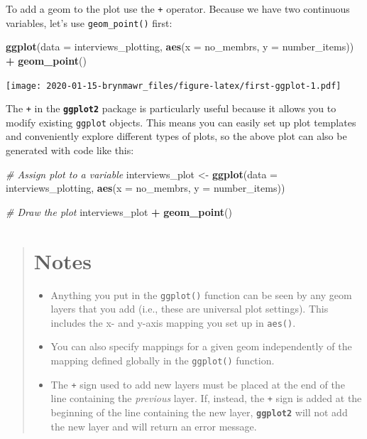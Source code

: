 \documentclass[]{book}
\newenvironment{Shaded}{\begin{snugshade}}{\end{snugshade}}
\newcommand{\KeywordTok}[1]{\textcolor[rgb]{0.13,0.29,0.53}{\textbf{#1}}}
\newcommand{\DataTypeTok}[1]{\textcolor[rgb]{0.13,0.29,0.53}{#1}}
\newcommand{\StringTok}[1]{\textcolor[rgb]{0.31,0.60,0.02}{#1}}
\newcommand{\CommentTok}[1]{\textcolor[rgb]{0.56,0.35,0.01}{\textit{#1}}}
\newcommand{\OperatorTok}[1]{\textcolor[rgb]{0.81,0.36,0.00}{\textbf{#1}}}
\newcommand{\NormalTok}[1]{#1}
\providecommand{\tightlist}{%
  \setlength{\itemsep}{0pt}\setlength{\parskip}{0pt}}
\begin{document}
To add a geom to the plot use the \texttt{+} operator. Because we have
two continuous variables, let's use \texttt{geom\_point()} first:

\begin{Shaded}
\begin{Highlighting}[]
\KeywordTok{ggplot}\NormalTok{(}\DataTypeTok{data =}\NormalTok{ interviews_plotting, }\KeywordTok{aes}\NormalTok{(}\DataTypeTok{x =}\NormalTok{ no_membrs, }\DataTypeTok{y =}\NormalTok{ number_items)) }\OperatorTok{+}
\StringTok{    }\KeywordTok{geom_point}\NormalTok{()}
\end{Highlighting}
\end{Shaded}

\texttt{[image: 2020-01-15-brynmawr\_files/figure-latex/first-ggplot-1.pdf]}

The \texttt{+} in the \textbf{\texttt{ggplot2}} package is particularly
useful because it allows you to modify existing \texttt{ggplot} objects.
This means you can easily set up plot templates and conveniently explore
different types of plots, so the above plot can also be generated with
code like this:

\begin{Shaded}
\begin{Highlighting}[]
\CommentTok{# Assign plot to a variable}
\NormalTok{interviews_plot <-}\StringTok{ }\KeywordTok{ggplot}\NormalTok{(}\DataTypeTok{data =}\NormalTok{ interviews_plotting, }\KeywordTok{aes}\NormalTok{(}\DataTypeTok{x =}\NormalTok{ no_membrs, }\DataTypeTok{y =}\NormalTok{ number_items))}

\CommentTok{# Draw the plot}
\NormalTok{interviews_plot }\OperatorTok{+}
\StringTok{    }\KeywordTok{geom_point}\NormalTok{()}
\end{Highlighting}
\end{Shaded}

\begin{quote}
\section{Notes}\label{notes}

\begin{itemize}
\tightlist
\item
  Anything you put in the \texttt{ggplot()} function can be seen by any
  geom layers that you add (i.e., these are universal plot settings).
  This includes the x- and y-axis mapping you set up in \texttt{aes()}.
\item
  You can also specify mappings for a given geom independently of the
  mapping defined globally in the \texttt{ggplot()} function.
\item
  The \texttt{+} sign used to add new layers must be placed at the end
  of the line containing the \emph{previous} layer. If, instead, the
  \texttt{+} sign is added at the beginning of the line containing the
  new layer, \textbf{\texttt{ggplot2}} will not add the new layer and
  will return an error message.
\end{itemize}
\end{quote}
\end{document}
